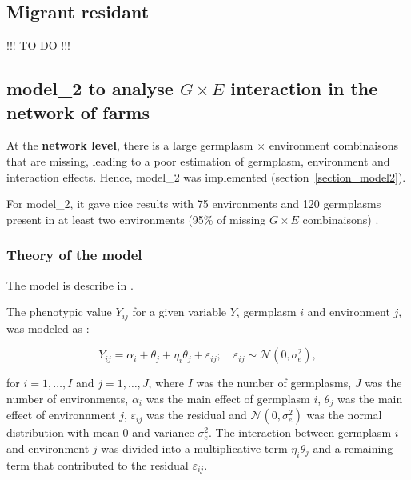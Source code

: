 \documentclass{book}\usepackage[]{graphicx}\usepackage[]{color}
\begin{document}
\newpage


\subsection{Migrant residant}
\label{migrant_residant}

!!! TO DO !!!

\newpage


\subsection{model\_2 to analyse $G \times E$ interaction in the network of farms }
\label{model_2}

At the \textbf{network level}, there is a large germplasm $\times$ environment combinaisons that are missing, leading to a poor estimation of germplasm, environment and interaction effects.
Hence, model\_2 was implemented (section~\ref{section_model2}).

For model\_2, it gave nice results with 75 environments and 120 germplasms present in at least two environments (95\% of missing $G \times E$ combinaisons) \citep{riviere_hierarchical_2016}.


\subsubsection{Theory of the model}
The model is describe in \citet{riviere_hierarchical_2016}.

The phenotypic value $Y_{ij}$ for a given variable $Y$, germplasm $i$ and environment $j$, was modeled as :

\begin{displaymath}
Y_{ij} = \alpha_{i} + \theta_{j} + \eta_{i}\theta_{j} + \varepsilon_{ij} ; \quad \varepsilon_{ij} \sim \mathcal{N} (0,\sigma^2_{e}),
\label{modele_gxe}
\end{displaymath}

for $i = 1,\ldots, I$ and $j = 1,\ldots, J$, where 
$I$ was the number of germplasms, 
$J$ was the number of environments,
$\alpha_{i}$ was the main effect of germplasm $i$,
$\theta_{j}$ was the main effect of environnment $j$,
$\varepsilon_{ij}$ was the residual and 
$\mathcal{N} (0,\sigma^2_{e})$ was the normal distribution with mean 0 and variance $\sigma^2_{e}$.
The interaction between germplasm $i$ and environment $j$ was divided into a multiplicative term $\eta_{i}\theta_{j}$ and a remaining term that contributed to the residual $\varepsilon_{ij}$.
\end{document}
